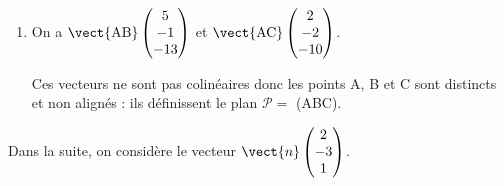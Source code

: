 \medskip




















\begin{enumerate}
	\item 
On a $\vect{\text{AB}}\begin{pmatrix}5\\-1\\- 13\end{pmatrix}$ et $\vect{\text{AC}}\begin{pmatrix}2\\-2\\- 10\end{pmatrix}$.

Ces vecteurs ne sont pas colinéaires donc les points A, B et C  sont distincts et non alignés : ils définissent le plan $\mathcal{P} = $ (ABC).
\end{enumerate}

Dans la suite, on considère le vecteur $\vect{n} \begin{pmatrix}2\\-3\\1\end{pmatrix}$.


